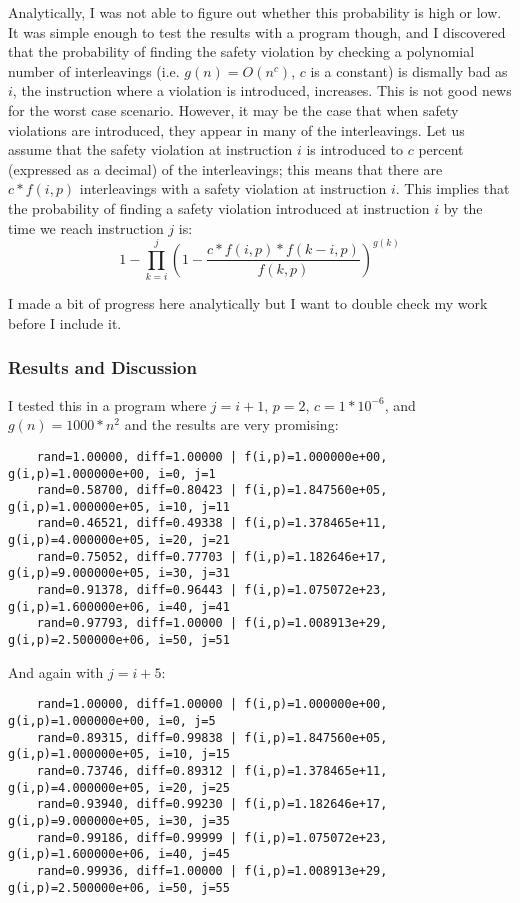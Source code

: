 \documentclass[12pt]{article}
\begin{document}
Analytically, I was not able to figure out whether this probability is high or low.  It was simple enough to test the results with a program though, and I discovered that the probability of finding the safety violation by checking a polynomial number of interleavings (i.e. $g(n) = O(n^c)$, $c$ is a constant) is dismally bad as $i$, the instruction where a violation is introduced, increases.  This is not good news for the worst case scenario.  However, it may be the case that when safety violations are introduced, they appear in many of the interleavings.  Let us assume that the safety violation at instruction $i$ is introduced to $c$ percent (expressed as a decimal) of the interleavings; this means that there are $c*f(i,p)$ interleavings with a safety violation at instruction $i$.  This implies that the probability of finding a safety violation introduced at instruction $i$ by the time we reach instruction $j$ is:
$$1 - \prod\limits_{k=i}^j \left(1 - \frac{c*f(i,p)*f(k-i,p)}{f(k,p)}\right)^{g(k)}$$

I made a bit of progress here analytically but I want to double check my work before I include it.  

\subsubsection{Results and Discussion}
I tested this in a program where $j=i+1$, $p=2$, $c=1*10^{-6}$, and $g(n) = 1000 * n^2$ and the results are very promising:
\begin{verbatim}
	rand=1.00000, diff=1.00000 | f(i,p)=1.000000e+00, g(i,p)=1.000000e+00, i=0, j=1
	rand=0.58700, diff=0.80423 | f(i,p)=1.847560e+05, g(i,p)=1.000000e+05, i=10, j=11
	rand=0.46521, diff=0.49338 | f(i,p)=1.378465e+11, g(i,p)=4.000000e+05, i=20, j=21
	rand=0.75052, diff=0.77703 | f(i,p)=1.182646e+17, g(i,p)=9.000000e+05, i=30, j=31
	rand=0.91378, diff=0.96443 | f(i,p)=1.075072e+23, g(i,p)=1.600000e+06, i=40, j=41
	rand=0.97793, diff=1.00000 | f(i,p)=1.008913e+29, g(i,p)=2.500000e+06, i=50, j=51
\end{verbatim}

And again with $j=i+5$:
\begin{verbatim}
	rand=1.00000, diff=1.00000 | f(i,p)=1.000000e+00, g(i,p)=1.000000e+00, i=0, j=5
	rand=0.89315, diff=0.99838 | f(i,p)=1.847560e+05, g(i,p)=1.000000e+05, i=10, j=15
	rand=0.73746, diff=0.89312 | f(i,p)=1.378465e+11, g(i,p)=4.000000e+05, i=20, j=25
	rand=0.93940, diff=0.99230 | f(i,p)=1.182646e+17, g(i,p)=9.000000e+05, i=30, j=35
	rand=0.99186, diff=0.99999 | f(i,p)=1.075072e+23, g(i,p)=1.600000e+06, i=40, j=45
	rand=0.99936, diff=1.00000 | f(i,p)=1.008913e+29, g(i,p)=2.500000e+06, i=50, j=55
\end{verbatim}
\end{document}
